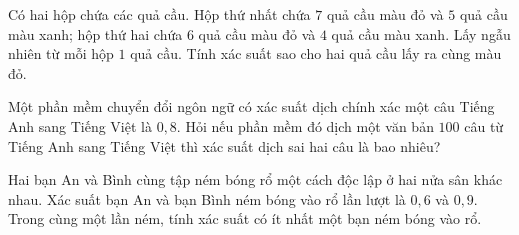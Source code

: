 \begin{vd}
	Có hai hộp chứa các quả cầu. Hộp thứ nhất  chứa $ 7 $ quả cầu màu đỏ và $ 5 $ quả cầu màu xanh; hộp thứ hai chứa $ 6 $ quả cầu màu đỏ và $ 4 $ quả cầu màu xanh. Lấy ngẫu nhiên từ mỗi hộp $ 1 $ quả cầu. Tính xác suất sao cho hai quả cầu lấy ra cùng màu đỏ.
\end{vd}

\begin{vd}
	Một phần mềm chuyển đổi ngôn ngữ có xác suất dịch chính xác một câu Tiếng Anh sang Tiếng Việt là $0{,}8$. Hỏi nếu phần mềm đó dịch một văn bản $100$ câu từ Tiếng Anh sang Tiếng Việt thì xác suất dịch sai hai câu là bao nhiêu?
\end{vd}
\begin{vd}%
	Hai bạn An và Bình cùng tập ném bóng rổ một cách độc lập ở hai nửa sân khác nhau. Xác suất bạn An và bạn Bình ném bóng vào rổ lần lượt là $0,6$ và $0,9$. Trong cùng một lần ném, tính xác suất có ít nhất một bạn ném bóng vào rổ.
\end{vd}

